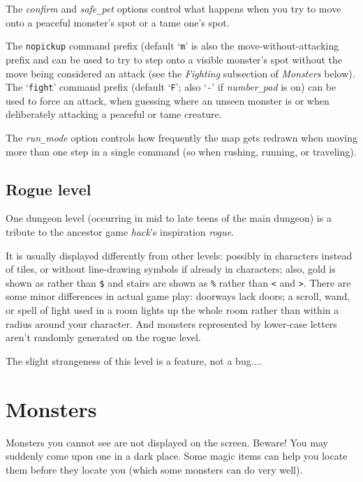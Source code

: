 The
{\it confirm\/}
and
{\it safe\verb+_+pet\/}
options control what happens when you try to move onto a peaceful monster's
spot or a tame one's spot.

The {\tt nopickup} command prefix (default `{\tt m}' is
also the move-without-attacking prefix and can be used to try to step
onto a visible monster's spot without the move being considered an attack
(see the {\it Fighting\/} subsection of {\it Monsters\/} below).
The `{\tt fight}' command prefix (default `{\tt F}';
also `{\tt -}' if
{\it number\verb+_+pad\/}
is on) can be used to force an attack, when guessing where an unseen
monster is or when deliberately attacking a peaceful or tame creature.

The
{\it run\verb+_+mode}
option controls how frequently the map gets redrawn when moving more
than one step in a single command (so when rushing, running, or traveling).

\subsection*{Rogue level}

One dungeon level (occurring in mid to late teens of the main dungeon)
is a tribute to the ancestor game {\it hack}'s inspiration {\it rogue}.

It is usually displayed differently from other levels: possibly in
characters instead of tiles, or without line-drawing symbols if already
in characters; also, gold is shown as {\tt *} rather than {\tt \verb+$+}
and stairs are shown as {\tt \verb+%+} rather than {\tt <} and {\tt >}.
There are some minor differences in actual game play: doorways lack
doors; a scroll, wand, or spell of light used in a room lights up the
whole room rather than within a radius around your character.
And monsters represented by lower-case letters aren't randomly
generated on the rogue level.

The slight strangeness of this level is a feature, not a bug....

\section{Monsters}

Monsters you cannot see are not displayed on the screen.  Beware!
You may suddenly come upon one in a dark place.  Some magic items can
help you locate them before they locate you (which some monsters can do
very well).

